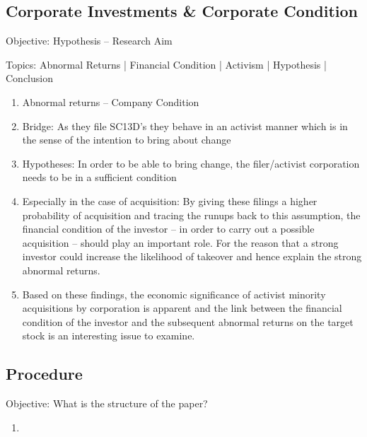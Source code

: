 \documentclass[12pt]{article}
\begin{document}
\subsection{Corporate Investments \& Corporate Condition}
\begin{center}
Objective: Hypothesis -- Research Aim 
\end{center}
Topics: Abnormal Returns | Financial Condition | Activism | Hypothesis | Conclusion
    \begin{enumerate}
        \item Abnormal returns -- Company Condition 
        \item Bridge: As they file SC13D's they behave in an activist manner which is in the sense of \citet{Klein2009} the intention to bring about change
        \item Hypotheses: In order to be able to bring change, the filer/activist corporation needs to be in a sufficient condition 
    
        \item Especially in the case of acquisition: By giving these filings a higher probability of acquisition and tracing the runups back to this assumption, the financial condition of the investor -- in order to carry out a possible acquisition -- should play an important role. For the reason that a strong investor could increase the likelihood of takeover and hence explain the strong abnormal returns.

        \item Based on these findings, the economic significance of activist minority acquisitions by corporation is apparent and the link between the financial condition of the investor and the subsequent abnormal returns on the target stock is an interesting issue to examine. 
    \end{enumerate}

\subsection{Procedure}
\begin{center}
Objective: What is the structure of the paper?
\end{center}

    \begin{enumerate}
        \item 
    \end{enumerate}
\end{document}
